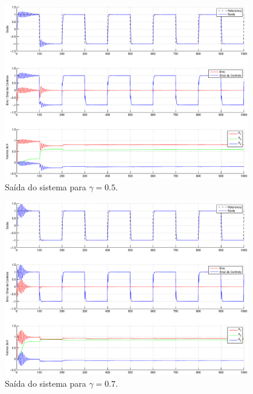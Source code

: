 \begin{figure}[htb]
    \centering
    \includegraphics[width=0.95\textwidth]{imgs/questao3/saida_gamma_0.5.eps}
    \caption{Saída do sistema para $\gamma = 0.5$.}
    \label{fig:q3_saida_gamma_0.5}
\end{figure}

\begin{figure}[htb]
    \centering
    \includegraphics[width=0.95\textwidth]{imgs/questao3/saida_gamma_0.7.eps}
    \caption{Saída do sistema para $\gamma = 0.7$.}
    \label{fig:q3_saida_gamma_0.7}
\end{figure}


